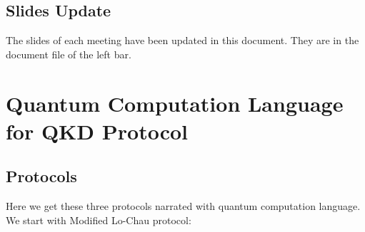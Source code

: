 \documentclass{report}
\theoremstyle{defn_style}
\begin{document}
\section{Slides Update}

The slides of each meeting have been updated in this document. They are in the document file of the left bar.

\chapter{Quantum Computation Language for QKD Protocol}
\newpage
\section{Protocols}
Here we get these three protocols narrated with quantum computation language. We start with Modified Lo-Chau protocol:
\end{document}
